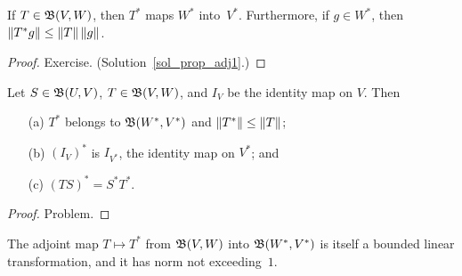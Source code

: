 \begin{prop}\label{prop_adj1} If $T \in \mathfrak{B}(V,W)$, then $T^*$ maps $W^*$ into~$V^*$.
Furthermore, if $g \in W^*$, then $\lVert T^*g\rVert \le \lVert T\rVert \, \lVert g\rVert$.
\end{prop}

\begin{proof} Exercise. (Solution~\ref{sol_prop_adj1}.)  \ns   \end{proof}

\begin{prop} Let $S \in \mathfrak{B}(U,V)$, $T \in \mathfrak{B}(V,W)$, and $I_V$ be the identity map on $V$.
Then
 \begin{enumerate}
  \item[(a)] $T^*$ belongs to $\mathfrak{B}(W^*,V^*)$ and $\lVert T^*\rVert \le \lVert T\rVert$;
  \item[(b)] $(I_V)^*$ is $I_{V^*}$, the identity map on $V^*$; and
  \item[(c)] $(TS)^* = S^*T^*$.
 \end{enumerate}
\end{prop}

\begin{proof} Problem.   \ns  \end{proof}

\begin{prob}\label{prob_adj_bl} The adjoint map $T \mapsto T^*$ from $\mathfrak{B}(V,W)$ into
$\mathfrak{B}(W^*,V^*)$ is itself a bounded linear transformation, and it has norm not
exceeding~$1$.
\end{prob}







\endinput

